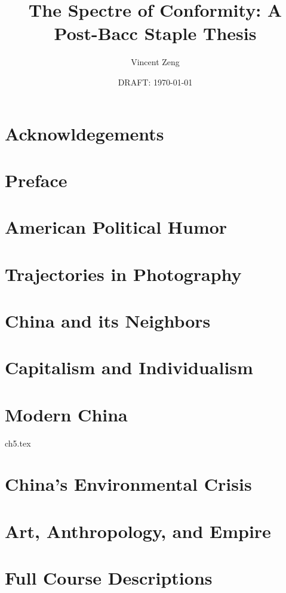 \documentclass{book}[10pt]
\title{The Spectre of Conformity: A Post-Bacc Staple Thesis}
\author{Vincent Zeng}
\date{DRAFT: \today}
\begin{document}
\maketitle



\frontmatter
\chapter{Acknowldegements}


\tableofcontents

\chapter{Preface}



\mainmatter

\chapter{American Political Humor}


\chapter{Trajectories in Photography}


\chapter{China and its Neighbors}


\chapter{Capitalism and Individualism}


\chapter{Modern China}
 {ch5.tex}

\chapter{China's Environmental Crisis}


\chapter{Art, Anthropology, and Empire}


\appendix

\chapter{Full Course Descriptions}


\printindex
\end{document}
